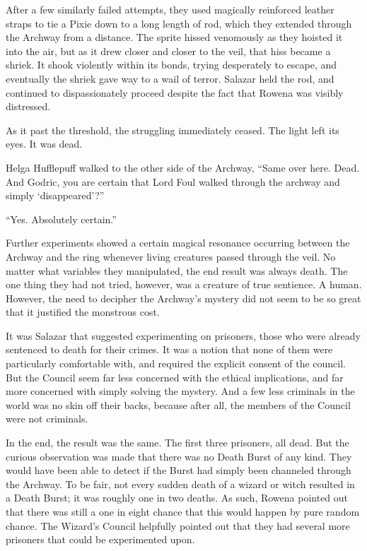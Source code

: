 After a few similarly failed attempts, they used magically reinforced leather straps to tie a Pixie down to a long length of rod, which they extended through the Archway from a distance. The sprite hissed venomously as they hoisted it into the air, but as it drew closer and closer to the veil, that hiss became a shriek. It shook violently within its bonds, trying desperately to escape, and eventually the shriek gave way to a wail of terror. Salazar held the rod, and continued to dispassionately proceed despite the fact that Rowena was visibly distressed.

As it past the threshold, the struggling immediately ceased. The light left its eyes. It was dead.

Helga Hufflepuff walked to the other side of the Archway, “Same over here. Dead. And Godric, you are certain that Lord Foul walked through the archway and simply ‘disappeared’?”

“Yes. Absolutely certain.”

Further experiments showed a certain magical resonance occurring between the Archway and the ring whenever living creatures passed through the veil. No matter what variables they manipulated, the end result was always death. The one thing they had not tried, however, was a creature of true sentience. A human. However, the need to decipher the Archway’s mystery did not seem to be so great that it justified the monstrous cost.

It was Salazar that suggested experimenting on prisoners, those who were already sentenced to death for their crimes. It was a notion that none of them were particularly comfortable with, and required the explicit consent of the council. But the Council seem far less concerned with the ethical implications, and far more concerned with simply solving the mystery. And a few less criminals in the world was no skin off their backs, because after all, the members of the Council were not criminals.

In the end, the result was the same. The first three prisoners, all dead. But the  curious observation was made that there was no Death Burst of any kind. They would have been able to detect if the Burst had simply been channeled through the Archway. To be fair, not every sudden death of a wizard or witch resulted in a Death Burst; it was roughly one in two deaths. As such, Rowena pointed out that there was still a one in eight chance that this would happen by pure random chance. The Wizard’s Council helpfully pointed out that they had several more prisoners that could be experimented upon.

